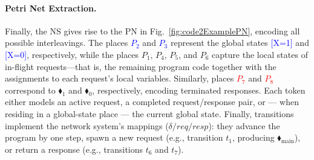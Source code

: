

\paragraph{Petri Net Extraction.}

Finally, the NS gives rise to the PN in Fig.~\ref{fig:code2ExamplePN}, encoding all possible interleavings. The places \textcolor{blue}{ $P_2$} and \textcolor{blue}{$P_3$} represent the global states \textcolor{blue}{[X=1]} and \textcolor{blue}{[X=0]}, respectively, while the places $P_1$, $P_4$, $P_5$, and $P_6$ capture the local states of in-flight requests—that is, the remaining program code together with the assignments to each request’s local variables. Similarly, places \textcolor{red}{$P_7$} and \textcolor{red}{$P_8$} correspond to {\color{red}$\blacklozenge_1$} and {\color{red}$\blacklozenge_0$}, respectively, encoding terminated responses. Each token either models an active request, a completed request/response pair, or --- when residing in a global-state place --- the current global state. Finally, transitions implement the network system’s mappings ($\delta/req/resp$): they advance the program by one step, spawn a new request (e.g., transition $t_1$, producing {\color{ForestGreen}$\blacklozenge_{\mathrm{main}}$}), or return a response (e.g., transitions $t_6$ and $t_7$).


%


